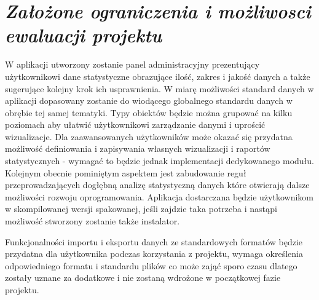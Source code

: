 \documentclass[a4paper,10pt]{report}
\newcommand{\customstylechapter}[1]{\large{\textit{#1}}}
\begin{document}
\chapter{\customstylechapter{Założone ograniczenia i możliwosci ewaluacji projektu}}
{W aplikacji utworzony zostanie panel administracyjny prezentujący użytkownikowi 
dane statystyczne obrazujące ilość, zakres i jakość danych a także sugerujące 
kolejny krok ich usprawnienia. W miarę możliwości standard danych w aplikacji 
dopasowany zostanie do wiodącego globalnego standardu danych w obrębie tej samej 
tematyki. Typy obiektów będzie można grupować na kilku poziomach aby ułatwić 
użytkownikowi zarządzanie danymi i uprościć wizualizacje. Dla zaawansowanych 
użytkowników może okazać się przydatna możliwość definiowania i zapisywania 
własnych wizualizacji i raportów statystycznych - wymagać to będzie jednak 
implementacji dedykowanego modułu. Kolejnym obecnie pominiętym aspektem jest 
zabudowanie reguł przeprowadzających dogłębną analizę statystyczną danych które 
otwierają dalsze możliwości rozwoju oprogramowania. Aplikacja dostarczana 
będzie użytkownikom w skompilowanej wersji spakowanej, jeśli zajdzie taka 
potrzeba i nastąpi możliwość stworzony zostanie także instalator.}

{Funkcjonalności importu i eksportu danych ze standardowych formatów będzie 
przydatna dla użytkownika podczas korzystania z projektu, wymaga określenia 
odpowiedniego formatu i standardu plików co może zająć sporo czasu dlatego 
zostały uznane za dodatkowe i nie zostaną wdrożone w początkowej fazie projektu.}
\end{document}
